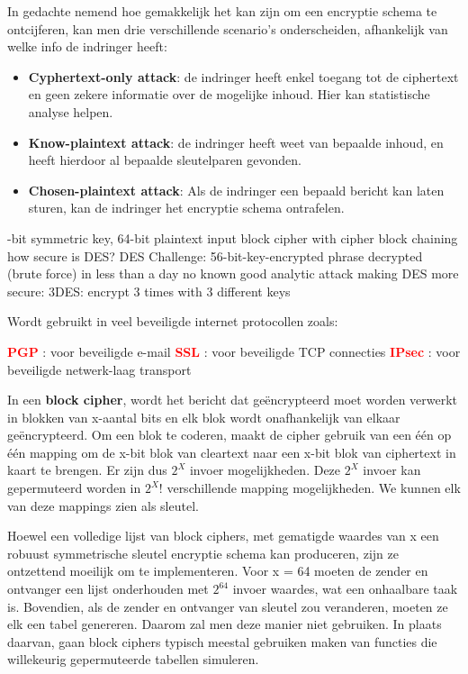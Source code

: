 \noindent In gedachte nemend hoe gemakkelijk het kan zijn om een encryptie schema te ontcijferen, kan men drie verschillende scenario’s onderscheiden, afhankelijk van welke info de indringer heeft:
\begin{itemize}
    \item \textbf{Cyphertext-only attack}: de indringer heeft enkel toegang tot de ciphertext en geen zekere informatie over de mogelijke inhoud. Hier kan statistische analyse helpen.
    \item \textbf{Know-plaintext attack}: de indringer heeft weet van bepaalde inhoud, en heeft hierdoor al bepaalde sleutelparen gevonden.
    \item \textbf{Chosen-plaintext attack}: Als de indringer een bepaald bericht kan laten sturen, kan de indringer het encryptie schema ontrafelen.
\end{itemize}


\bi
{}-bit symmetric key, 64-bit plaintext input
\itf block cipher with cipher block chaining
\itf how secure is DES?
    \bi
    \itf DES Challenge: 56-bit-key-encrypted phrase decrypted (brute force) in less than a day
    \itf no known good analytic attack
    \ei
\itf making DES more secure:
    \bi
    \itf 3DES: encrypt 3 times with 3 different keys
    \ei
\ei

\newpage


Wordt gebruikt in veel beveiligde internet protocollen zoals:

\bi
\itf \textcolor{red}{\textbf{PGP}} : voor beveiligde e-mail
\itf \textcolor{red}{\textbf{SSL}} : voor beveiligde TCP connecties
\itf \textcolor{red}{\textbf{IPsec}} : voor beveiligde netwerk-laag transport
\ei

	
\noindent In een \textbf{block cipher}, wordt het bericht dat geëncrypteerd moet worden verwerkt in blokken van x-aantal bits en elk blok wordt onafhankelijk van elkaar geëncrypteerd. Om een blok te coderen, maakt de cipher gebruik van een één op één mapping om de x-bit blok van cleartext naar een x-bit blok van ciphertext in kaart te brengen. Er zijn dus $2^X$ invoer mogelijkheden. Deze $2^X$ invoer kan gepermuteerd worden in $2^X$! verschillende mapping mogelijkheden. We kunnen elk van deze mappings zien als sleutel.

\noindent Hoewel een volledige lijst van block ciphers, met gematigde waardes van x een robuust symmetrische sleutel encryptie schema kan produceren, zijn ze ontzettend moeilijk om te implementeren. Voor x = 64 moeten de zender en ontvanger een lijst onderhouden met $2^{64}$ invoer waardes, wat een onhaalbare taak is. Bovendien, als de zender en ontvanger van sleutel zou veranderen, moeten ze elk een tabel genereren. Daarom zal men deze manier niet gebruiken.
In plaats daarvan, gaan block ciphers typisch meestal gebruiken maken van functies die willekeurig gepermuteerde tabellen simuleren.

